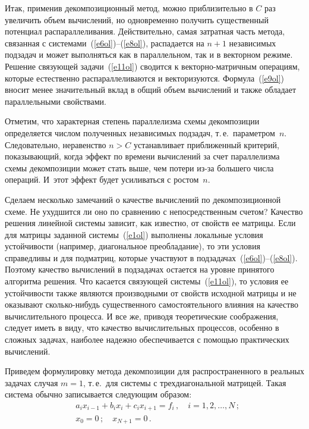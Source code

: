 \begin{multicols}{2}
     Итак, применив декомпозиционный метод, можно приблизительно в $C$
раз увеличить объем вычис\-ле\-ний, но одновременно получить существенный
потенциал распараллеливания. Действительно, самая затратная часть метода,
связанная с %
 сис\-те\-ма\-ми~(\ref{e6ol})--(\ref{e8ol}), распадается на $n + 1$
независимых подзадач и может выполняться как в параллельном, так и в
векторном режиме. Решение связующей задачи~(\ref{e11ol}) сводится к
векторно-матричным операциям, которые естественно распараллеливаются и
векторизуются. Формула~(\ref{e9ol}) вносит менее значительный вклад в
общий объем вычислений и также обладает параллельными свойствами.

     Отметим, что характерная степень параллелизма схемы декомпозиции
определяется числом полученных независимых подзадач, т.\,е.\
па\-ра\-мет\-ром~$n$. Следовательно, неравенство $n > C$ устанав\-ли\-ва\-ет
приближенный критерий, показывающий, когда эффект по времени
вычислений за счет параллелизма схемы декомпозиции может стать выше, чем
потери из-за большего числа операций. И~этот эффект будет усиливаться с
ростом~$n$.

     Сделаем несколько замечаний о качестве вы\-чис\-ле\-ний по
декомпозиционной схеме. Не ухудшится ли оно по сравнению с
непосредственным счетом? Качество решения линейной системы зависит, как
известно, от свойств ее матрицы. Если для матрицы заданной
системы~(\ref{e1ol}) выполнены локальные условия устойчивости (например,
диагональное преобладание), то эти условия справедливы и для под\-мат\-риц,
которые участвуют в подзадачах~(\ref{e6ol})--(\ref{e8ol}). Поэтому качество
вычислений в подзадачах остается на уровне принятого алгоритма решения.
Что касается связующей системы~(\ref{e11ol}), то условия ее устойчивости
также являются производными от свойств исходной матрицы и не оказывают
сколько-нибудь существенного самостоятельного влияния на качество
вычислительного процесса. И все же, приводя теоретические соображения,
следует иметь в виду, что качество вычислительных процессов, особенно в
сложных задачах, наиболее надежно обеспечивается с помощью практических
вычислений.

     Приведем формулировку метода декомпозиции для распространенного в
реальных задачах случая $m = 1$, т.\,е.\ для системы с трехдиагональной
мат\-ри\-цей. Такая система обычно записывается сле\-ду\-ющим образом:
     \begin{align*}
     &a_i x_{i-1} +b_ix_i +c_ix_{i+1} = f_i\,,\quad i=1, 2, \ldots , N\,;
     \\
&x_0 =0 \,; \quad x_{N+1} =0\,.
     \end{align*}


\end{multicols}
